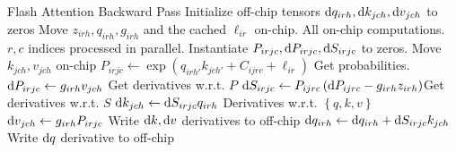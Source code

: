 \begin{algo}{Flash Attention Backward Pass}
\State Initialize off-chip tensors $ {\rm d} q _{ irh }, {\rm d} k _{ jch }, {\rm d} v _{ jch }  $ to zeros
\State Move  $ z _{ irh }, q _{ irh }, g _{ irh }$ and the cached $ \ell _{ ir } $ on-chip.
 \Comment All on-chip computations. $ r, c $ indices processed in parallel.
    \State Instantiate $ P _{ irjc },{\rm d} P _{ irjc } ,{\rm d} S _{ irjc } $  to zeros.
    \State Move  $ k_{ jch },v _{ jch }$ on-chip
    \State $ P _{ irjc } \gets   \exp \left (q _{ irh' } k _{ jch' } + C _{ ijrc } + \ell _{ ir } \right )$ \Comment Get probabilities.
    \State $ {\rm d} P _{ irjc } \gets   g _{ irh} v _{ jch }$ \Comment Get derivatives w.r.t. $ P $
    \State $ {\rm d} S _{ irjc } \gets  P _{ ijrc }\left ( {\rm d} P _{ ijrc } - g _{ irh } z _{ irh }  \right ) $\Comment Get derivatives w.r.t. $ S $
    \State $ {\rm d} k _{ jch } \gets  {\rm d} S _{ irjc }  q _{ irh }$ \Comment Derivatives w.r.t. $ \left \{q,  k, v \right \} $
    \State $ {\rm d} v _{ jch } \gets  g _{ irh }P _{ irjc }$
    \State Write $ {\rm d} k, {\rm d} v $  derivatives to off-chip
    \State $ {\rm d} q _{ irh } \gets {\rm d} q _{ irh }+ {\rm d} S _{ irjc }  k _{ jch } $
\EndFor
\State Write $ {\rm d} q $  derivative to off-chip
\EndFor
\label{algo_fa_bwd_advanced}
\end{algo}
